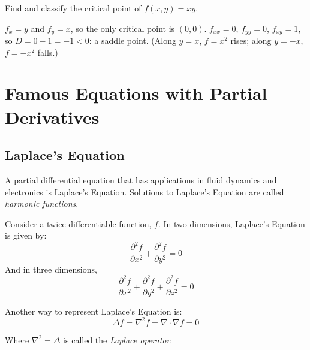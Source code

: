 \begin{Exercise}[title = {Saddle or Not?}, label = grad_saddle]
Find and classify the critical point of $f(x, y) = xy$.
\end{Exercise}
\begin{Answer}[ref = grad_saddle]
$f_x = y$ and $f_y = x$, so the only critical point is $(0, 0)$. $f_{xx} =
0$, $f_{yy} = 0$, $f_{xy} = 1$, so $D = 0 - 1 = -1 < 0$: a saddle point.
(Along $y = x$, $f = x^2$ rises; along $y = -x$, $f = -x^2$ falls.)
\end{Answer}

\section{Famous Equations with Partial Derivatives}

\subsection{Laplace's Equation}
A partial differential equation that has applications in fluid dynamics and 
electronics is Laplace's Equation. Solutions to 
Laplace's Equation are called \textit{harmonic functions}. 

\begin{mdframed}[style = important, frametitle = {Laplace's Equation}]
Consider a twice-differentiable function, $f$. In two dimensions, Laplace's 
Equation is given by:
$$ \frac{\partial ^2 f}{\partial x^2} + \frac{\partial^2 f}{\partial y^2} = 0$$
And in three dimensions, 
$$\frac{\partial ^2 f}{\partial x^2} + \frac{\partial ^2 f}{\partial y^2} + 
\frac{\partial ^2 f}{\partial z^2} = 0$$
\end{mdframed}

Another way to represent Laplace's Equation is:
$$\Delta f = \nabla^2 f = \nabla \cdot \nabla f = 0$$

Where $\nabla ^2 = \Delta$ is called the \textit{Laplace operator}. 

